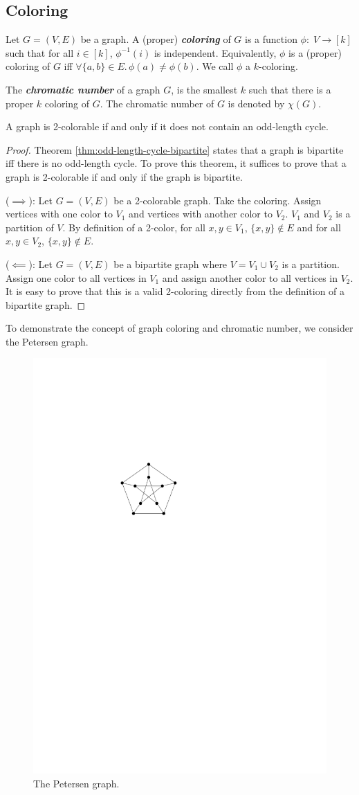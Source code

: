 \subsection{Coloring}

\begin{definition}
    Let $G = (V,E)$ be a graph. A (proper) \textit{\textbf{coloring}} of $G$ is a function $\phi:\; V \to [k]$ such that for all $i \in [k]$, $\phi^{-1}(i)$ is independent. Equivalently, $\phi$ is a (proper) coloring of $G$ iff $\forall \{a,b\} \in E.\, \phi(a) \neq \phi(b)$. We call $\phi$ a $k$-coloring.
\end{definition}

\begin{definition}
    The \textit{\textbf{chromatic number}} of a graph $G$, is the smallest $k$ such that there is a proper $k$ coloring of $G$. The chromatic number of $G$ is denoted by $\chi(G)$.
\end{definition}

\begin{theorem}
    A graph is 2-colorable if and only if it does not contain an odd-length cycle.
\end{theorem}

\begin{proof}
    Theorem \ref{thm:odd-length-cycle-bipartite} states that a graph is bipartite iff there is no odd-length cycle. To prove this theorem, it suffices to prove that a graph is 2-colorable if and only if the graph is bipartite.

    ($\implies$): Let $G = (V,E)$ be a 2-colorable graph. Take the coloring. Assign vertices with one color to $V_1$ and vertices with another color to $V_2$. $V_1$ and $V_2$ is a partition of $V$. By definition of a 2-color, for all $x,y \in V_1$, $\{x,y\} \not\in E$ and for all $x,y \in V_2$, $\{x,y\} \not\in E$.

    ($\impliedby$): Let $G=(V,E)$ be a bipartite graph where $V = V_1 \cup V_2$ is a partition. Assign one color to all vertices in $V_1$ and assign another color to all vertices in $V_2$. It is easy to prove that this is a valid 2-coloring directly from the definition of a bipartite graph.
\end{proof}

To demonstrate the concept of graph coloring and chromatic number, we consider the Petersen graph.

\begin{figure}[htbp]
    \centering
    \includegraphics[width=0.2\linewidth]{figures/peterson-graph.pdf}
    \caption{The Petersen graph.}
    \label{fig:petersen-graph}
\end{figure}